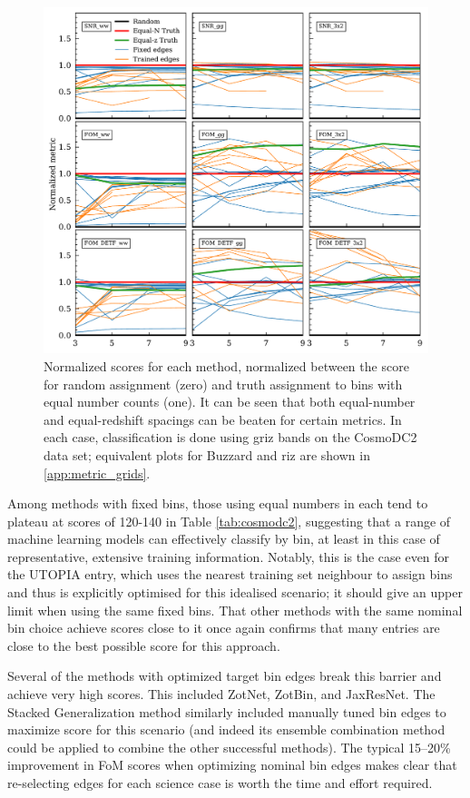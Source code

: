 \documentclass[twocolumn,twocolappendix]{aastex63}
\begin{document}
\begin{figure}
\includegraphics[width=1\linewidth]{results/metric_grid_dc2_griz.pdf}
\caption{Normalized scores for each method, normalized between the score for random assignment (zero) and truth assignment to bins with equal number counts (one).  It can be seen that both equal-number and equal-redshift spacings can be beaten for certain metrics.  In each case, classification is done using griz bands on the CosmoDC2 data set; equivalent plots for Buzzard and riz are shown in \autoref{app:metric_grids}.}
\label{fig:metric_grid_dc2_griz}
\end{figure}


Among methods with fixed bins, those using equal numbers in each tend to plateau at scores of
120-140 in Table \ref{tab:cosmodc2}, suggesting that a range of machine learning models can
effectively classify by bin, at least in this case of representative, extensive training
information.  Notably, this is the case even for the \textsc{UTOPIA} entry, which uses the nearest 
training set neighbour to assign bins and thus is explicitly optimised
for this idealised scenario; it should give an upper limit when using the same fixed bins.
That other methods with the same nominal bin choice achieve scores close to it once again
confirms that many entries are close to the best possible score for this approach.


Several of the methods with optimized target bin edges break this
barrier and achieve very high scores.  This included ZotNet, ZotBin,  and JaxResNet.  The
Stacked Generalization method similarly included manually tuned bin edges to maximize
score for this scenario (and indeed its ensemble combination method could be applied to
combine the other successful methods). The typical 15--20\% improvement in FoM scores when optimizing
nominal bin edges makes clear that re-selecting edges for each science case is worth the time and effort required.
\end{document}
